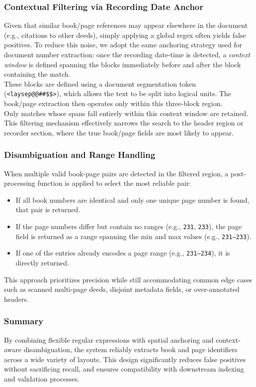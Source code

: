 \documentclass{article}
\begin{document}
\subsubsection{Contextual Filtering via Recording Date Anchor}

Given that similar book/page references may appear elsewhere in the document (e.g., citations to other deeds), simply applying a global regex often yields false positives. To reduce this noise, we adopt the same anchoring strategy used for document number extraction: once the recording date-time is detected, a \textit{context window} is defined spanning the blocks immediately before and after the block containing the match. \\

These blocks are defined using a document segmentation token (\texttt{<laysep@@\#\#\$\$>}), which allows the text to be split into logical units. The book/page extraction then operates only within this three-block region. \\

Only matches whose spans fall entirely within this context window are retained. This filtering mechanism effectively narrows the search to the header region or recorder section, where the true book/page fields are most likely to appear.

\subsubsection{Disambiguation and Range Handling}

When multiple valid book-page pairs are detected in the filtered region, a post-processing function is applied to select the most reliable pair:

\begin{itemize}
    \item If all book numbers are identical and only one unique page number is found, that pair is returned.
    \item If the page numbers differ but contain no ranges (e.g., \texttt{231}, \texttt{233}), the page field is returned as a range spanning the min and max values (e.g., \texttt{231--233}).
    \item If one of the entries already encodes a page range (e.g., \texttt{231--234}), it is directly returned.
\end{itemize}

This approach prioritizes precision while still accommodating common edge cases such as scanned multi-page deeds, disjoint metadata fields, or over-annotated headers.

\subsubsection{Summary}

By combining flexible regular expressions with spatial anchoring and context-aware disambiguation, the system reliably extracts book and page identifiers across a wide variety of layouts. This design significantly reduces false positives without sacrificing recall, and ensures compatibility with downstream indexing and validation processes.
\end{document}
